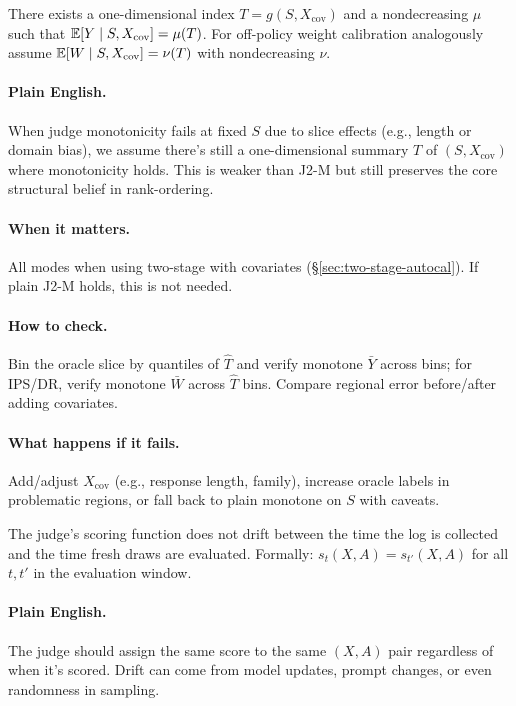 \begin{assumption}
\label{assump:j2mx}
There exists a one-dimensional index $T=g(S,X_{\mathrm{cov}})$ and a nondecreasing $\mu$ such that
$\operatorname{\mathbb{E}}[Y\mid S,X_{\mathrm{cov}}]=\mu(T)$.
For off-policy weight calibration analogously assume
$\operatorname{\mathbb{E}}[W\mid S,X_{\mathrm{cov}}]=\nu(T)$ with nondecreasing $\nu$.
\end{assumption}

\paragraph{Plain English.} When judge monotonicity fails at fixed $S$ due to slice effects (e.g., length or domain bias), we assume there's still a one-dimensional summary $T$ of $(S, X_{\mathrm{cov}})$ where monotonicity holds. This is weaker than J2-M but still preserves the core structural belief in rank-ordering.

\paragraph{When it matters.} All modes when using two-stage \autocal{} with covariates (\S\ref{sec:two-stage-autocal}). If plain J2-M holds, this is not needed.

\paragraph{How to check.} Bin the oracle slice by quantiles of $\widehat T$ and verify monotone $\bar Y$ across bins; for IPS/DR, verify monotone $\bar W$ across $\widehat T$ bins. Compare regional error before/after adding covariates.

\paragraph{What happens if it fails.} Add/adjust $X_{\mathrm{cov}}$ (e.g., response length, family), increase oracle labels in problematic regions, or fall back to plain monotone on $S$ with caveats.

\begin{assumption}
\label{assum:stability}
The judge's scoring function does not drift between the time the log is collected and the time fresh draws are evaluated. Formally: $s_t(X, A) = s_{t'}(X, A)$ for all $t, t'$ in the evaluation window.
\end{assumption}

\paragraph{Plain English.} The judge should assign the same score to the same $(X, A)$ pair regardless of when it's scored. Drift can come from model updates, prompt changes, or even randomness in sampling.

